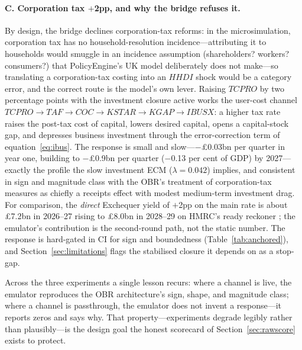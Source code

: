 \paragraph{C. Corporation tax $+$2pp, and why the bridge refuses it.} By design, the bridge declines corporation-tax reforms: in the microsimulation, corporation tax has no household-resolution incidence---attributing it to households would smuggle in an incidence assumption (shareholders? workers? consumers?) that PolicyEngine's UK model deliberately does not make---so translating a corporation-tax costing into an $HHDI$ shock would be a category error, and the correct route is the model's own lever. Raising $TCPRO$ by two percentage points with the investment closure active works the user-cost channel $TCPRO \to TAF \to COC \to KSTAR \to KGAP \to IBUSX$: a higher tax rate raises the post-tax cost of capital, lowers desired capital, opens a capital-stock gap, and depresses business investment through the error-correction term of equation~\eqref{eq:ibus}. The response is small and slow---$-$\pounds 0.03bn per quarter in year one, building to $-$\pounds 0.9bn per quarter ($-$0.13 per cent of GDP) by 2027---exactly the profile the slow investment ECM ($\lambda = 0.042$) implies, and consistent in sign and magnitude class with the OBR's treatment of corporation-tax measures as chiefly a receipts effect with modest medium-term investment drag. For comparison, the \emph{direct} Exchequer yield of $+$2pp on the main rate is about \pounds 7.2bn in 2026--27 rising to \pounds 8.0bn in 2028--29 on HMRC's ready reckoner \citep{hmrc2025reckoner}; the emulator's contribution is the second-round path, not the static number. The response is hard-gated in CI for sign and boundedness (Table~\ref{tab:anchored}), and Section~\ref{sec:limitations} flags the stabilised closure it depends on as a stop-gap.

Across the three experiments a single lesson recurs: where a channel is live, the emulator reproduces the OBR architecture's sign, shape, and magnitude class; where a channel is passthrough, the emulator does not invent a response---it reports zeros and says why. That property---experiments degrade legibly rather than plausibly---is the design goal the honest scorecard of Section~\ref{sec:rawscore} exists to protect.
